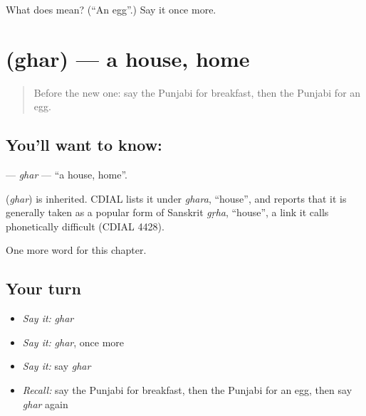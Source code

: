 \begin{tcolorbox}[breakable,colback=teal!4,colframe=teal!35!black,title={Before you move on}]
What does  mean? (\textquotedblleft{}An egg\textquotedblright{}.) Say it once more.
\end{tcolorbox}
\section[\texorpdfstring{\pa{ਘਰ} (ghar)}{ਘਰ (ghar)}]{ (ghar) — a house, home}

\label{lesson:PA-C67-ghar}



\begin{quote}
Before the new one: say the Punjabi for breakfast, then the Punjabi for an egg.
\end{quote}

\subsection*{You'll want to know: }
\textbf{} — \emph{ghar} — \textquotedblleft{}a house, home\textquotedblright{}.

\begin{cousinweb}
\textbf{} (\emph{ghar}) is inherited. CDIAL lists it under \emph{ghara}, \textquotedblleft{}house\textquotedblright{}, and reports that it is generally taken as a popular form of Sanskrit \emph{gṛha}, \textquotedblleft{}house\textquotedblright{}, a link it calls phonetically difficult (CDIAL 4428).
\end{cousinweb}

\begin{grammarlens}[title={What you've built}]
One more word for this chapter.
\end{grammarlens}

\subsection*{Your turn}
\begin{itemize}
\raggedright
  \item \emph{Say it:} \emph{ghar}
  \item \emph{Say it:} \emph{ghar}, once more
  \item \emph{Say it:} say \emph{ghar}
  \item \emph{Recall:} say the Punjabi for breakfast, then the Punjabi for an egg, then say \emph{ghar} again
\end{itemize}

